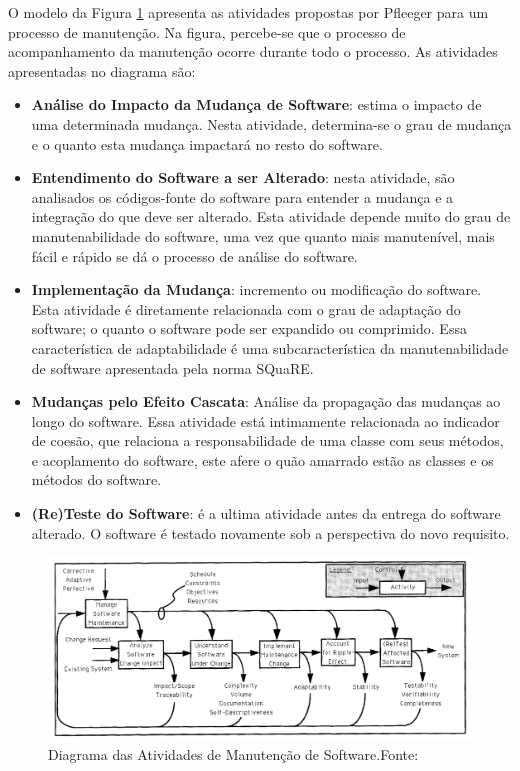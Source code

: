 O modelo da Figura \ref{img:modelo_manutencao} apresenta as atividades propostas por Pfleeger \cite{pfleeger_framework_1990} para um processo de manutenção. Na figura, percebe-se que o processo de acompanhamento da manutenção ocorre durante todo o processo. As atividades apresentadas no diagrama são:

\begin{itemize}
\item \textbf{Análise do Impacto da Mudança de Software}: estima o impacto de uma determinada mudança. Nesta atividade, determina-se o grau de mudança e o quanto esta mudança impactará no resto do software. 
\item \textbf{Entendimento do Software a ser Alterado}: nesta atividade, são analisados os códigos-fonte do software para entender a mudança e a integração do que deve ser alterado. Esta atividade depende muito do grau de manutenabilidade do software, uma vez que quanto mais manutenível, mais fácil e rápido se dá o processo de análise do software.
\item \textbf{Implementação da Mudança}: incremento ou modificação do software. Esta atividade é diretamente relacionada com o grau de adaptação do software; o quanto o software pode ser expandido ou comprimido. Essa característica de adaptabilidade é uma subcaracterística da manutenabilidade de software apresentada pela norma SQuaRE. 
\item \textbf{Mudanças pelo Efeito Cascata}: Análise da propagação das mudanças ao longo do software. Essa atividade está intimamente relacionada ao indicador de coesão, que relaciona a responsabilidade de uma classe com seus métodos, e acoplamento do software, este afere o quão amarrado estão as classes e os métodos do software.
\item \textbf{(Re)Teste do Software}: é a ultima atividade antes da entrega do software alterado. O software é testado novamente sob a perspectiva do novo requisito.
\end{itemize}

\graphicspath{{figuras/}}
\begin{figure}[h!]
\centering
\includegraphics[scale=0.50]{Manutencao}
\caption{Diagrama das Atividades de Manutenção de Software.Fonte:\cite{pfleeger_framework_1990}}
\label{img:modelo_manutencao}
\end{figure}


